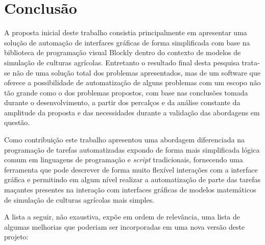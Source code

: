 \documentclass[tg]{mdtufsm}
\begin{document}
        \chapter {Conclusão}

            A proposta inicial deste trabalho consistia principalmente em apresentar uma solução de automação de interfaces gráficas de forma simplificada com base na biblioteca de programação visual Blockly dentro do contexto de modelos de simulação de culturas agrícolas. Entretanto o resultado final desta pesquisa trata-se não de uma solução total dos problemas apresentados, mas de um software que oferece a possibilidade de automatização de alguns problemas com um escopo não tão grande como o dos problemas propostos, com base nas conclusões tomada durante o desenvolvimento, a partir dos percalços e da análise constante da amplitude da proposta e das necessidades durante a validação das abordagens em questão.

            Como contribuição este trabalho apresentou uma abordagem diferenciada na programação de tarefas automatizadas expondo de forma mais simplificada lógica comum em linguagens de programação e \emph{script} tradicionais, fornecendo uma ferramenta que pode descrever de forma muito flexível interações com a interface gráfica e permitindo em algum nível realizar a automatização de parte das tarefas maçantes presentes na interação com interfaces gráficas de modelos matemáticos de simulação de culturas agrícolas mais simples.

            A lista a seguir, não exaustiva, expõe em ordem de relevância, uma lista  de algumas melhorias que poderiam ser incorporadas em uma nova versão deste projeto:
\end{document}
